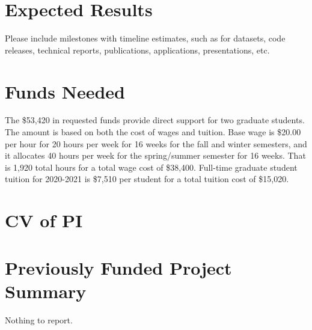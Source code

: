 \documentclass[11pt,onecolumn,notitlepage]{article}
\begin{document}
\section*{Expected Results}
Please include milestones with timeline estimates, such as for datasets, code releases, technical reports, publications, applications, presentations, etc. 

\section*{Funds Needed}

The \$53,420 in requested funds provide direct support for two graduate students. The amount is based on both the cost of wages and tuition. Base wage is \$20.00 per hour for 20 hours per week for 16 weeks for the fall and winter semesters, and it allocates 40 hours per week for the spring/summer semester for 16 weeks. That is 1,920 total hours for a total wage cost of \$38,400. Full-time graduate student tuition for 2020-2021 is \$7,510 per student for a total tuition cost of \$15,020. 

\appendix
\appendixpage




\section{CV of PI}

\section{Previously Funded Project Summary}
Nothing to report.
\end{document}
